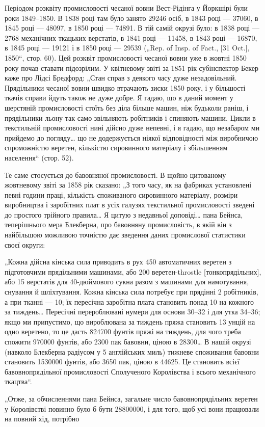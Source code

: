 
Періодом розквіту промисловості чесаної вовни Вест-Рідінга
у Йоркшірі були роки 1849--1850. В 1838 році там було занято
\num{29246} осіб, в 1843 році — \num{37060}, в 1845 році — \num{48097}, в 1850 році —
\num{74891}. В тій самій окрузі було: в 1838 році — 2768 механічних
ткацьких верстатів, в 1841 році — \num{11458}, в 1843 році — \num{16870},
в 1845 році — \num{19121} і в 1850 році — \num{29539} („Rep. of Insp. of Fact.,
[31 Oct.], 1850“, стор. 60). Цей розквіт промисловості чесаної
вовни уже в жовтні 1850 року почав ставати підозрілим. У квітневому
звіті за 1851 рік субінспектор Бекер каже про Лідсі Бредфорд:
„Стан справ з деякого часу дуже незадовільний. Прядільники
чесаної вовни швидко втрачають зиски 1850 року, і у більшості
ткачів справи йдуть також не дуже добре. Я гадаю, що
в даний момент у шерстяній промисловості стоїть без діла більше
машин, ніж будьколи раніш, і прядільники льону так само звільняють
робітників і спиняють машини. Цикли в текстильній промисловості
нині дійсно дуже непевні, і я гадаю, що незабаром
ми прийдемо до погляду\dots{} що не додержується ніякої відповідності
між виробничою спроможністю веретен, кількістю сировинного
матеріалу і збільшенням населення“ (стор. 52).

Те саме стосується до бавовняної промисловості. В щойно
цитованому жовтневому звіті за 1858 рік сказано: „З того часу,
як на фабриках установлені певні години праці, кількість споживаного
сировинного матеріалу, розміри виробництва і заробітних
плат в усіх галузях текстильної промисловості зведені
до простого трійного правила\dots{} Я цитую з недавньої доповіді\dots{}
пана Бейнса, теперішнього мера Блекберна, про бавовняну промисловість,
в якій він з найбільшою можливою точністю дає
зведення даних промислової статистики своєї округи:

„Кожна дійсна кінська сила приводить в рух 450 автоматичних
веретен з підготовчими прядільними машинами, або 200 веретен-throstle
[тонкопрядільних], або 15 верстатів для 40-дюймового
сукна разом з машинами для намотування, снування й
шліхтування. Кожна кінська сила потребує при прядінні 2 робітників,
а при тканні — 10; їх пересічна заробітна плата становить
понад 10 на кожного за тиждень\dots{} Пересічні
перероблювані нумери для основи 30--32 і для утка 34--36;
якщо ми припустимо, що вироблювана за тиждень пряжа становить
13 унцій на одно веретено, то це дасть \num{824700} фунтів
пряжі на тиждень, для чого треба спожити \num{970000} фунтів, або
2300 пак бавовни, ціною в \num{28300}\dots{} В нашій
окрузі (навколо Блекберна радіусом у 5 англійських миль)
тижневе споживання бавовни становить \num{1530000} фунтів, або
3650 пак, ціною в \num{44625}. Це становить 
всієї бавовнопрядільної промисловості Сполученого Королівства
і   всього механічного ткацтва“.

„Отже, за обчисленнями пана Бейнса, загальне число бавовнопрядільних
веретен у Королівстві повинно було б бути \num{28800000},
і для того, щоб усі вони працювали на повний хід, потрібно
\parbreak{}  %
